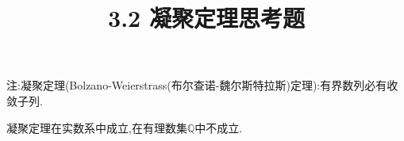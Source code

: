 \documentclass[windows,list,answers]{BHCexam}
\begin{document}
\everymath{\displaystyle}
\title{3.2 凝聚定理\quad 思考题}

\maketitle

注:凝聚定理(Bolzano-Weierstrass(布尔查诺-魏尔斯特拉斯)定理):有界数列必有收敛子列.

\begin{questions}
    \question
    凝聚定理在实数系中成立,在有理数集$\mathbb{Q} $中不成立.
    \begin{solution}{1cm}
        \methodonly

    \end{solution}
\end{questions}
\end{document}
